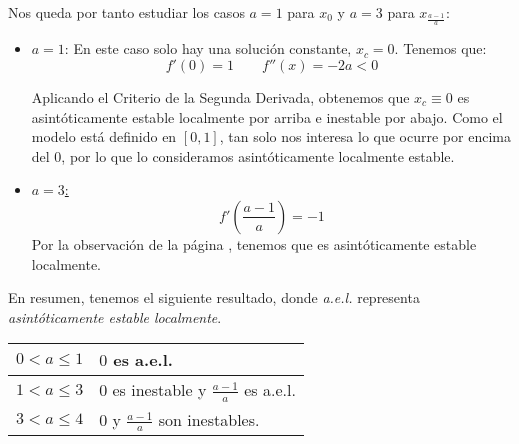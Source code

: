 Nos queda por tanto estudiar los casos $a = 1$ para $x_0$ y $a = 3$ para $x_{\frac{a-1}{a}}$:
\begin{itemize}
    \item \ul{$a = 1$}: En este caso solo hay una solución constante, $x_c=0$. Tenemos que:
    \begin{equation*}
        f'(0) = 1 \qquad
        f''(x) = -2a < 0
    \end{equation*}

    Aplicando el Criterio de la Segunda Derivada, obtenemos que $x_c \equiv 0$ es asintóticamente estable localmente por arriba e inestable por abajo. Como el modelo está definido en $[0,1]$, tan solo nos interesa lo que ocurre por encima del $0$, por lo que lo consideramos asintóticamente localmente estable.

    \item \ul{$a=3$:}
    \begin{equation*}
        f'\left(\dfrac{a-1}{a}\right) = -1
    \end{equation*}
    Por la observación de la página \pageref{obs:polinomio2grado}, tenemos que es asintóticamente estable localmente.
\end{itemize}

En resumen, tenemos el siguiente resultado, donde \emph{a.e.l.} representa \emph{asintóticamente estable localmente}.
\begin{table}[H]
    \centering
    \begin{tabular}{c|l}
        $0< a \leq 1$ & $0$ es a.e.l.\\ \hline
        $1<a\leq 3$ & $0$ es inestable y $\frac{a-1}{a}$ es a.e.l.\\ \hline
        $3<a\leq 4$ & $0$ y $\frac{a-1}{a}$ son inestables.
    \end{tabular}
\end{table}
